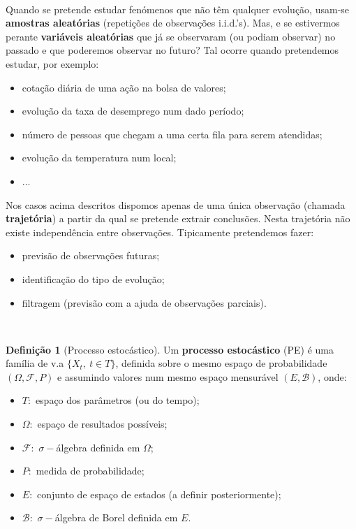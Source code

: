 \documentclass[
  11pt,
  a4paper,
]{book}
\theoremstyle{definition}
\newtheorem{definition}{Definição}[chapter]
\theoremstyle{definition}
\theoremstyle{definition}
\theoremstyle{definition}
\theoremstyle{remark}
\begin{document}
\(\,\)

Quando se pretende estudar fenómenos que não têm qualquer evolução, usam-se \textbf{amostras
aleatórias} (repetições de observações i.i.d.'s). Mas, e se estivermos perante \textbf{variáveis
aleatórias} que já se observaram (ou podiam observar) no passado e que poderemos observar
no futuro? Tal ocorre quando pretendemos estudar, por exemplo:

\begin{itemize}
\item
  cotação diária de uma ação na bolsa de valores;
\item
  evolução da taxa de desemprego num dado período;
\item
  número de pessoas que chegam a uma certa fila para serem atendidas;
\item
  evolução da temperatura num local;
\item
  \(\ldots\)
\end{itemize}

Nos casos acima descritos dispomos apenas de uma única observação (chamada \textbf{trajetória}) a
partir da qual se pretende extrair conclusões. Nesta trajetória não existe independência
entre observações. Tipicamente pretendemos fazer:

\begin{itemize}
\item
  previsão de observações futuras;
\item
  identificação do tipo de evolução;
\item
  filtragem (previsão com a ajuda de observações parciais).
\end{itemize}

\(\,\)

\begin{definition}[Processo estocástico]

Um \textbf{processo estocástico} (PE) é uma família de v.a \(\{X_t, ~t \in T\}\), definida sobre o
mesmo espaço de probabilidade \((\Omega, \mathcal{F}, P)\) e assumindo valores num mesmo
espaço mensurável \((E,\mathcal{B})\), onde:

\begin{itemize}
\item
  \(T:\) espaço dos parâmetros (ou do tempo);
\item
  \(\Omega:\) espaço de resultados possíveis;
\item
  \(\mathcal{F}:\) \(\sigma-\)álgebra definida em \(\Omega\);
\item
  \(P:\) medida de probabilidade;
\item
  \(E:\) conjunto de espaço de estados (a definir posteriormente);
\item
  \(\mathcal{B}:\) \(\sigma-\)álgebra de Borel definida em \(E\).
\end{itemize}

\end{definition}
\end{document}
